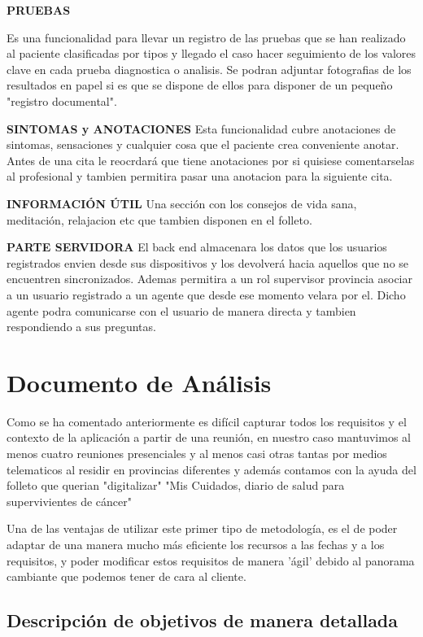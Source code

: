 \documentclass[../pfc.tex]{subfiles}
\begin{document}
	\textbf{PRUEBAS}
	
	Es una funcionalidad para llevar un registro de las pruebas que se han realizado al paciente clasificadas por tipos y llegado el caso hacer seguimiento de los valores clave en cada prueba diagnostica o analisis. Se podran adjuntar fotografias de los resultados en papel si es que se dispone de ellos para disponer de un pequeño "registro documental".
	
	
	\textbf{SINTOMAS y ANOTACIONES}
	Esta funcionalidad cubre anotaciones de sintomas, sensaciones y cualquier cosa que el paciente crea conveniente anotar. Antes de una cita le reocrdará que tiene anotaciones por si quisiese comentarselas al profesional y tambien permitira pasar una anotacion para la siguiente cita.
	
	
	\textbf{INFORMACIÓN ÚTIL}
	Una sección con los consejos de vida sana, meditación, relajacion etc que tambien disponen en el folleto. 
	
	\textbf{PARTE SERVIDORA}
	El back end almacenara los datos que los usuarios registrados envien desde sus dispositivos y los devolverá hacia aquellos que no se encuentren sincronizados. Ademas permitira a un rol supervisor provincia asociar a un usuario registrado a un agente que desde ese momento velara por el. Dicho agente podra comunicarse con el usuario de manera directa y tambien respondiendo a sus preguntas.  
	
	
	\section{Documento de Análisis}

	Como se ha comentado anteriormente es difícil capturar todos los requisitos y el contexto de la aplicación a partir de una reunión, en nuestro caso mantuvimos al menos cuatro reuniones presenciales y al menos casi otras tantas por medios telematicos al residir en provincias diferentes y además contamos con la ayuda del folleto que querian "digitalizar" "Mis Cuidados, diario de salud para supervivientes de cáncer"

			
	Una de las ventajas de utilizar este primer tipo de metodología, es el de poder adaptar de una manera mucho más eficiente los recursos a las fechas y a los requisitos, y poder modificar estos requisitos de manera 'ágil' debido al panorama cambiante que podemos tener de cara al cliente.
			
		
	\subsection{Descripción de objetivos de manera detallada}
	
\end{document}
